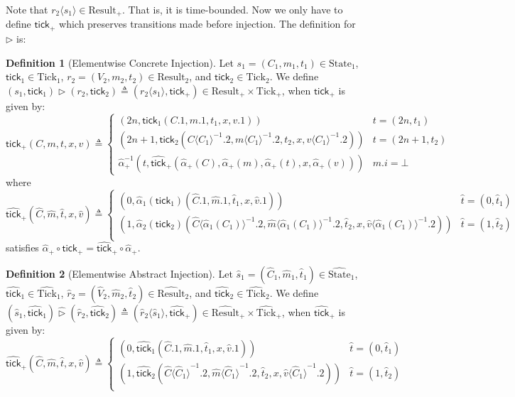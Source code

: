 \documentclass{article}
\theoremstyle{definition}
\newtheorem{definition}{Definition}[section]
\newcommand*{\A}[1]{\widehat{#1}}
\newcommand*{\mem}{m}
\newcommand*{\State}{\text{State}}
\newcommand*{\Result}{\text{Result}}
\newcommand*{\Tick}{\text{Tick}}
\newcommand*{\tick}{\mathsf{tick}}
\newcommand*{\inject}[2]{{#2}\langle{#1}\rangle}
\newcommand*{\delete}[2]{{#2}{\langle{#1}\rangle}^{-1}}
\begin{document}
Note that $\inject{s_1}{r_2}\in\Result_+$. That is, it is time-bounded.
Now we only have to define $\tick_+$ which preserves transitions made before injection.
The definition for $\rhd$ is:
\begin{definition}[Elementwise Concrete Injection]
  Let $s_1=(C_1,\mem_1,t_1)\in\State_1$, $\tick_1\in\Tick_1$, $r_2=(V_2,\mem_2,t_2)\in\Result_2$, and $\tick_2\in\Tick_2$.
  We define $(s_1,\tick_1)\rhd(r_2,\tick_2)\triangleq(\inject{s_1}{r_2},\tick_+)\in\Result_+\times\Tick_+$, when $\tick_+$ is given by:
  \[
    \tick_+(C,\mem,t,x,v)\triangleq
    \begin{cases}
      (2n, \tick_1(C.1,\mem.1,t_1,x,v.1))                                                        & t=(2n,t_1)   \\
      (2n+1,\tick_2(\delete{C_1}{C}.2,\delete{C_1}{\mem}.2,t_2,x,\delete{C_1}{v}.2))             & t=(2n+1,t_2) \\
      \A\alpha_+^{-1}(t,\A\tick_+(\A\alpha_+(C),\A\alpha_+(\mem),\A\alpha_+(t),x,\A\alpha_+(v))) & \mem.i=\bot
    \end{cases}
  \]
  where
  \[
    \A\tick_+(\A{C},\A\mem,\A{t},x,\A{v})\triangleq
    \begin{cases}
      (0,\A\alpha_1(\tick_1)(\A{C}.1,\A\mem.1,\A{t}_1,x,\A{v}.1))                                                                                     & \A{t}=(0,\A{t}_1) \\
      (1,\A\alpha_2(\tick_2)(\delete{\A\alpha_1({C}_1)}{\A{C}}.2,\delete{\A\alpha_1({C}_1)}{\A\mem}.2,\A{t}_2,x,\delete{\A\alpha_1({C}_1)}{\A{v}}.2)) & \A{t}=(1,\A{t}_2) \\
    \end{cases}
  \]
  satisfies $\A\alpha_+\circ\tick_+=\A\tick_+\circ\A\alpha_+$.
\end{definition}

\begin{definition}[Elementwise Abstract Injection]
  Let $\A{s}_1=(\A{C}_1,\A\mem_1,\A{t}_1)\in\A\State_1$, $\A\tick_1\in\A\Tick_1$, $\A{r}_2=(\A{V}_2,\A\mem_2,\A{t}_2)\in\A\Result_2$, and $\A\tick_2\in\A\Tick_2$.
  We define $(\A{s}_1,\A\tick_1)\A\rhd(\A{r}_2,\A\tick_2)\triangleq(\inject{\A{s}_1}{\A{r}_2},\A\tick_+)\in\A\Result_+\times\A\Tick_+$, when $\A\tick_+$ is given by:
  \[
    \A\tick_+(\A{C},\A\mem,\A{t},x,\A{v})\triangleq
    \begin{cases}
      (0,\A\tick_1(\A{C}.1,\A\mem.1,\A{t}_1,x,\A{v}.1))                                                       & \A{t}=(0,\A{t}_1) \\
      (1,\A\tick_2(\delete{\A{C}_1}{\A{C}}.2,\delete{\A{C}_1}{\A\mem}.2,\A{t}_2,x,\delete{\A{C}_1}{\A{v}}.2)) & \A{t}=(1,\A{t}_2) \\
    \end{cases}
  \]
\end{definition}
\end{document}

